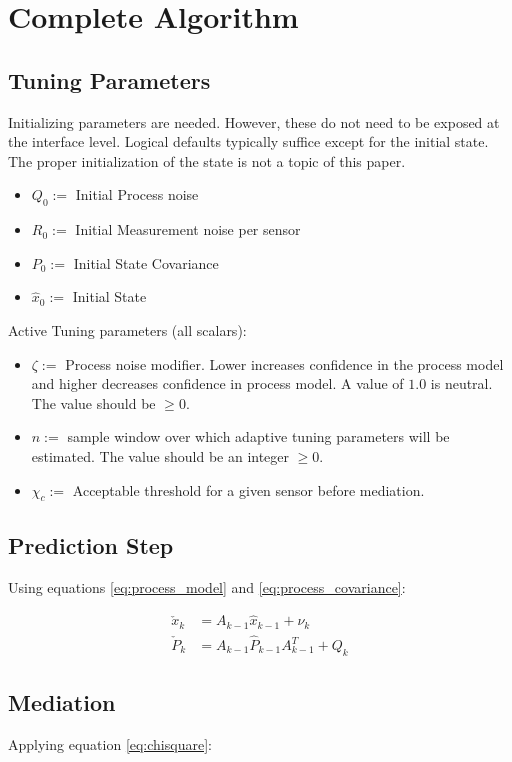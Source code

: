 \documentclass[a4paper]{article}
\begin{document}
	\section{Complete Algorithm}

	\subsection{Tuning Parameters}
	Initializing parameters are needed. However, these do not need to be exposed at the interface level. Logical defaults typically suffice except for the initial state. The proper initialization of the state is not a topic of this paper.
	\begin{itemize}
		\item $Q_0 :=$ Initial Process noise
		\item $R_0 :=$ Initial Measurement noise per sensor
		\item $P_0 :=$ Initial State Covariance
		\item $\hat{x}_0 :=$ Initial State
	\end{itemize}

	Active Tuning parameters (all scalars):
		\begin{itemize}
		\item $\zeta :=$ Process noise modifier. Lower increases confidence in the process model and higher decreases confidence in process model. A value of $1.0$ is neutral. The value should be $\geq 0$.
		\item $n :=$ sample window over which adaptive tuning parameters will be estimated. The value should be an integer $\geq 0$.
		\item $\chi_c :=$ Acceptable threshold for a given sensor before mediation.
	\end{itemize}

	\subsection{Prediction Step}
	Using equations \ref{eq:process_model} and \ref{eq:process_covariance}:

	\begin{align*}
		\check{x}_k &= A_{k-1} \hat{x}_{k-1} + \nu_k\\
		\check{P}_k &= A_{k-1} \hat{P}_{k-1} A_{k-1}^T + Q_k
	\end{align*}

	\subsection{Mediation}
	Applying equation \ref{eq:chisquare}:
\end{document}
